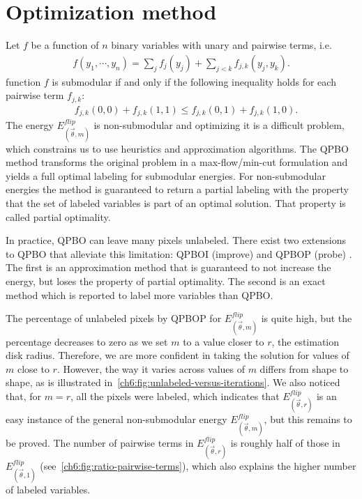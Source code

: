 

\section{Optimization method}
\label{ch6:sec:optimization-method}

Let $f$ be a function of $n$ binary variables with unary and pairwise terms, i.e.
\begin{align*}
f(y_1,\cdots, y_n) = \sum_{j}{f_j(y_j)} + \sum_{j < k}{f_{j,k}(y_j,y_k)}.
\end{align*}
%
 function $f$ is submodular if and only if the following inequality holds for each pairwise term $f_{j,k}$: %
\begin{align*}
  \quad f_{j,k}(0,0) + f_{j,k}(1,1) \leq f_{j,k}(0,1) + f_{j,k}(1,0).
\end{align*}
%
The energy $E_{(\vec{\theta},m)}^{flip}$ is non-submodular and optimizing it is a difficult problem, which constrains us to use heuristics and
approximation algorithms. The QPBO method \cite{hammer84} transforms the original problem in a max-flow/min-cut
formulation and yields a full optimal labeling for submodular energies. For non-submodular energies the method is
guaranteed to return a partial labeling with the property that the set of labeled variables is part of an optimal
solution. That property is called partial optimality.

In practice, QPBO can leave many pixels unlabeled. There exist two extensions to QPBO that alleviate this limitation:
QPBOI (improve) and QPBOP (probe) \cite{rother07qpbo}. The first is an approximation method that is guaranteed to not increase the energy,
but loses the property of partial optimality. The second is an exact method which is reported to label more variables
than QPBO.

The percentage of unlabeled pixels by QPBOP for $E_{(\vec{\theta},m)}^{flip}$ is quite high, but the percentage decreases to zero as we set $m$
to a value closer to $r$, the estimation disk radius. Therefore, we are more confident in taking the solution for values of $m$ close to $r$. However, the way it
varies across values of $m$ differs from shape to shape, as is illustrated in~\cref{ch6:fig:unlabeled-versus-iterations}. We also noticed that, for $m=r$, all the pixels were labeled, which
  indicates that $E_{(\vec{\theta},r)}^{flip}$ is an easy instance of the general non-submodular energy $E_{(\vec{\theta},m)}^{flip}$, but this remains to be
  proved. The number of pairwise terms in $E_{(\vec{\theta},r)}^{flip}$ is roughly half of those in $E_{(\vec{\theta},1)}^{flip}$ (see~\cref{ch6:fig:ratio-pairwise-terms}), which also explains the higher number of labeled variables.

